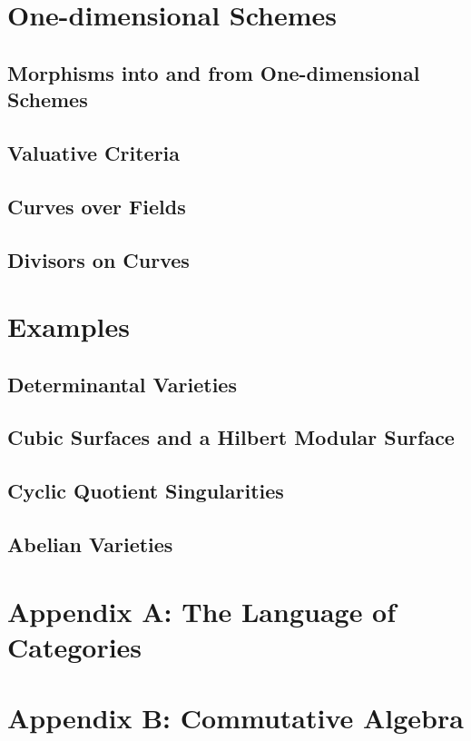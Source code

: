 \documentclass[11pt, a4paper]{article}
\begin{document}
\section{One-dimensional Schemes}

\subsection{Morphisms into and from One-dimensional Schemes}

\subsection{Valuative Criteria}

\subsection{Curves over Fields}

\subsection{Divisors on Curves}

\section{Examples}

\subsection{Determinantal Varieties}

\subsection{Cubic Surfaces and a Hilbert Modular Surface}

\subsection{Cyclic Quotient Singularities}

\subsection{Abelian Varieties}

\section*{Appendix A: The Language of Categories}

\section*{Appendix B: Commutative Algebra}

\end{document}
